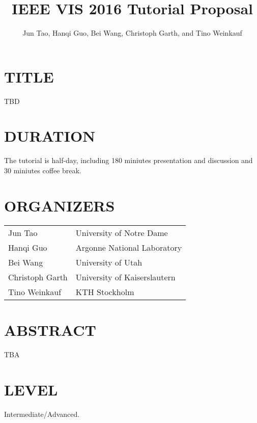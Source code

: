 \documentclass[preprint,journal]{vgtc}       %
\title{IEEE VIS 2016 Tutorial Proposal}
\author{Jun Tao, Hanqi Guo, Bei Wang, Christoph Garth, and Tino Weinkauf}
\begin{document}


\maketitle

\section*{TITLE}
TBD

\section*{DURATION}
The tutorial is half-day, including 180 miniutes presentation and discussion and 30 miniutes coffee break.

\section*{ORGANIZERS}

\vspace{-0.1in}
\begin{table}[H]
\begin{tabular}{ll}
Jun Tao & University of Notre Dame\\
Hanqi Guo & Argonne National Laboratory\\
Bei Wang & University of Utah\\
Christoph Garth & University of Kaiserslautern\\
Tino Weinkauf & KTH Stockholm
\end{tabular}
\end{table}

\section*{ABSTRACT}
TBA

\section*{LEVEL}
Intermediate/Advanced.
\end{document}
